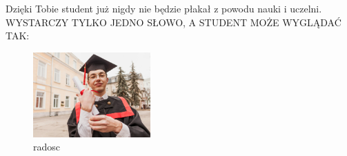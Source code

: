 Dzięki Tobie student już nigdy nie będzie płakał z powodu nauki i uczelni.
{{\Large WYSTARCZY TYLKO JEDNO SŁOWO, A STUDENT MOŻE WYGLĄDAĆ TAK:}}

\begin{figure}[htbp]
    \centering
    \includegraphics[width=0.4\textwidth]{pictures/zadowolony-student.jpg}
    \caption{radosc}
    \label{fig:radosc}
\end{figure}

